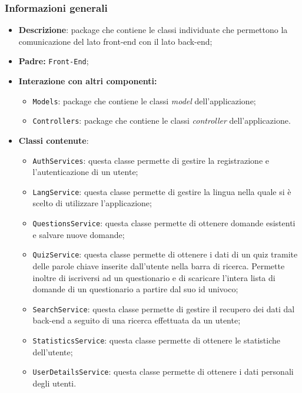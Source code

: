 \subsubsection{Informazioni generali}
\begin{itemize}
	\item \textbf{Descrizione}: package che contiene le classi individuate che permettono la comunicazione del lato front-end con il lato back-end;
	\item \textbf{Padre:} \texttt{Front-End};
	\item \textbf{Interazione con altri componenti:}
	\begin{itemize}
		\item \texttt{Models}: package che contiene le classi \textit{model} dell'applicazione;
		\item \texttt{Controllers}: package che contiene le classi \textit{controller} dell'applicazione.
	\end{itemize}
	\item \textbf{Classi contenute}:
	\begin{itemize}
		\item \texttt{AuthServices}: questa classe permette di gestire la registrazione e l'autenticazione di un utente;
		\item \texttt{LangService}: questa classe permette di gestire la lingua nella quale si è scelto di utilizzare l'applicazione;
		\item \texttt{QuestionsService}: questa classe permette di ottenere domande esistenti e salvare nuove domande;
		\item \texttt{QuizService}: questa classe permette di ottenere i dati di un quiz tramite delle parole chiave inserite dall'utente nella barra di ricerca. Permette inoltre di iscriversi ad un questionario e di scaricare l'intera lista di domande di un questionario a partire dal suo id univoco;
		\item \texttt{SearchService}: questa classe permette di gestire il recupero dei dati dal back-end a seguito di una ricerca effettuata da un utente;
		\item \texttt{StatisticsService}: questa classe permette di ottenere le statistiche dell'utente;
		\item \texttt{UserDetailsService}: questa classe permette di ottenere i dati personali degli utenti.
	\end{itemize} 
\end{itemize}